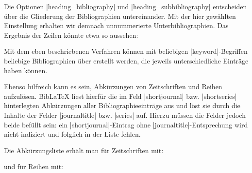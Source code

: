 \documentclass[a4paper,10pt,ngerman]{ltxdoc}
\begin{document}
Die Optionen |heading=bibliography| und |heading=subbibliography| entscheiden über die Gliederung der Bibliographien untereinander. Mit der hier gewählten Einstellung erhalten wir demnach unnummerierte Unterbibliographien. Das Ergebnis der Zeilen könnte etwa so aussehen:

\begin{refsection}
\nocite{Cic:Att,Fest,%
Ball2013,Taylor2008,Mann2011,Mundt2015,Kurapkat2014,%
Wulf-Rheidt2013,Bergmann2015,LTUR,Nieddu1995,Arnolds2005}

\setcounter{section}{0}
    \renewcommand\bibfont{\normalfont\normalsize}
    \setlength{\labwidthsameline}{5.5em} 
\begin{example}
\printbibheading[%
  heading=bibliography,
  title={Bibliographie}]%
\end{example}


\begin{example}
\printbibliography[%
  heading=subbibliography,
  keyword=ancient,%
  title={Antike Quellen}]
\end{example}

\begin{example}
\printbibliography[%
  heading=subbibliography,
  keyword=corpus,%
  title={Abkürzungen und Sigel}]

\printbibliography[%
  heading=subbibliography,
  notkeyword=ancient,%
  notkeyword=corpus,%
  title={Forschungsliteratur}]
\end{example}


Mit dem eben beschriebenen Verfahren können mit beliebigen |keyword|-Begriffen beliebige Bibliographien über  erstellt werden, die jeweils unterschiedliche Einträge haben können.

Ebenso hilfreich kann es sein, Abkürzungen von Zeitschriften und Reihen aufzulösen. Bib\LaTeX{} liest hierfür die im Feld |shortjournal| bzw. |shortseries| hinterlegten Abkürzungen aller Bibliographieeinträge aus und löst sie durch die Inhalte der Felder |journaltitle| bzw. |series| auf. Hierzu müssen die Felder jedoch beide befüllt sein: ein |shortjournal|-Eintrag ohne |journaltitle|-Entsprechung wird nicht indiziert und folglich in der Liste fehlen.

Die Abkürzungsliste erhält man für Zeitschriften mit:
\begin{example}
\end{example}

und für Reihen mit:
\begin{example}
\end{example}

\end{refsection}
\end{document}
